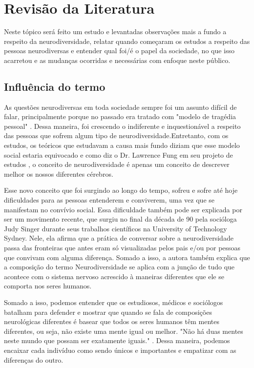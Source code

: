 \chapter{Revisão da Literatura}

Neste tópico será feito um estudo e levantadas observações mais a fundo a respeito da neurodiversidade, relatar quando começaram os estudos a respeito das pessoas neurodiversas e entender qual foi/é o papel da sociedade, no que isso acarretou e as mudanças ocorridas e necessárias com enfoque neste público.

\section{Influência do termo}
As questões neurodiversas em toda sociedade sempre foi um assunto difícil de falar, principalmente porque no passado era tratado com "modelo de tragédia pessoal" \cite{oliver1990politics}. Dessa maneira, foi crescendo o indiferente e inquestionável a respeito das pessoas que sofrem algum tipo de neurodiversidade.Entretanto, com os estudos, os teóricos que estudavam a causa mais fundo diziam que esse modelo social estaria equivocado e como diz o Dr. Lawrence Fung em seu projeto de estudos \cite{lawrencefung}, o conceito de neurodiversidade é apenas um conceito de descrever melhor os nossos diferentes cérebros. 

Esse novo conceito que foi surgindo ao longo do tempo, sofreu e sofre até hoje dificuldades para as pessoas entenderem e conviverem, uma vez que se manifestam no convívio social. Essa dificuldade também pode ser explicada por ser um movimento recente, que surgiu no final da década de 90 pela socióloga Judy Singer durante seus trabalhos científicos na University of Technology Sydney. Nele, ela afirma que a prática de conversar sobre a neurodiversidade passa das fronteiras que antes eram só visualizadas pelos pais e/ou por pessoas que convivam com alguma diferença. Somado a isso, a autora também explica que a composição do termo Neurodiversidade se aplica com a junção de tudo que acontece com o sistema nervoso acrescido à maneiras diferentes que ele se comporta nos seres humanos. 

Somado a isso, podemos entender que os estudiosos, médicos e sociólogos batalham para defender e mostrar que quando se fala de composições neurológicas diferentes é basear que todos os seres humanos têm mentes diferentes, ou seja, não existe uma mente igual ou melhor. "Não há duas mentes neste mundo que possam ser exatamente iguais." \cite{judysinger}. Dessa maneira, podemos encaixar cada indivíduo como sendo únicos e importantes e empatizar com as diferenças do outro. 


